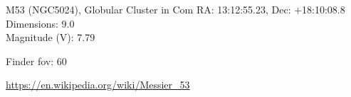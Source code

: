 \begin{block}{M53 (NGC5024), Globular Cluster in Com}
    RA: 13:12:55.23, Dec: +18:10:08.8 \\ 
    Dimensions: 9.0 \\ 
    Magnitude (V): 7.79



    Finder fov: 60 

    \url{https://en.wikipedia.org/wiki/Messier_53} 
\end{block}